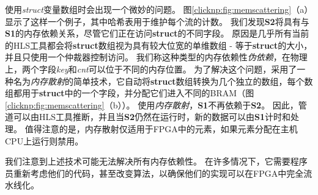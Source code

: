 使用\textit {struct}变量数组时会出现一个微妙的问题。
图\ref {clicknp:fig:memscattering}（a）显示了这样一个例子，其中哈希表用于维护每个流的计数。
我们发现\textbf {S2}将具有与\textbf {S1}的内存依赖关系，尽管它们正在访问\textbf {struct}的不同字段。
原因是几乎所有当前的HLS工具都会将\textbf {struct}数组视为具有较大位宽的单维数组 - 等于\textbf {struct}的大小，并且只使用一个仲裁器控制访问。
我们称这种类型的内存依赖性\textit {伪依赖}，在物理上，两个字段\textit {key}和\textit {cnt}可以位于不同的内存位置。
为了解决这个问题，\name 采用了一种名为\textit {内存散射}的简单技术，它自动将\textbf {struct}数组转换为几个独立的数组，每个数组都用于\textbf {struct}中的一个字段，并分配它们进入不同的BRAM（图 \ref {clicknp:fig:memscattering}（b））。
使用\textit {内存散射}，\textbf {S1}不再依赖于\textbf {S2}。
因此，管道可以由HLS工具推断，并且当\textbf {S2}仍然在运行时，新的数据可以由\textbf {S1}计时和处理。
值得注意的是，内存散射仅适用于FPGA中的元素，如果元素分配在主机CPU上运行则禁用。

我们注意到上述技术可能无法解决所有内存依赖性。
在许多情况下，它需要程序员重新考虑他们的代码，甚至改变算法，以确保他们的实现可以在FPGA中完全流水线化。

\iffalse
\textbf{新内容：元件之间共享内存，存储类型标识符 global / static / register。}
\fi

